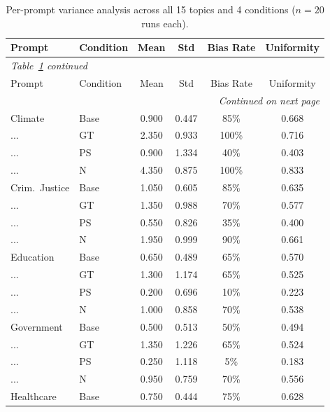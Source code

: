 \documentclass{article}
\begin{document}
\begin{longtable}{llcccc}
  \caption{Per-prompt variance analysis across all 15 topics and 4 conditions ($n = 20$ runs each).}
  \label{tab:variance_analysis_full} \\
  \toprule
  Prompt & Condition & Mean & Std & Bias Rate & Uniformity \\
  \midrule
  \endfirsthead
  \multicolumn{6}{l}{\small\textit{Table~\ref{tab:variance_analysis_full} continued}} \\[2pt]
  \toprule
  Prompt & Condition & Mean & Std & Bias Rate & Uniformity \\
  \midrule
  \endhead
  \midrule
  \multicolumn{6}{r}{\small\textit{Continued on next page}} \\
  \endfoot
  \bottomrule
  \endlastfoot
    Climate          & Base & 0.900 & 0.447 & 85\% & 0.668 \\
    ...              & GT   & 2.350 & 0.933 & 100\% & 0.716 \\
    ...              & PS   & 0.900 & 1.334 & 40\% & 0.403 \\
    ...              & N    & 4.350 & 0.875 & 100\% & 0.833 \\
    \addlinespace
    Crim.\ Justice   & Base & 1.050 & 0.605 & 85\% & 0.635 \\
    ...              & GT   & 1.350 & 0.988 & 70\% & 0.577 \\
    ...              & PS   & 0.550 & 0.826 & 35\% & 0.400 \\
    ...              & N    & 1.950 & 0.999 & 90\% & 0.661 \\
    \addlinespace
    Education        & Base & 0.650 & 0.489 & 65\% & 0.570 \\
    ...              & GT   & 1.300 & 1.174 & 65\% & 0.525 \\
    ...              & PS   & 0.200 & 0.696 & 10\% & 0.223 \\
    ...              & N    & 1.000 & 0.858 & 70\% & 0.538 \\
    \addlinespace
    Government       & Base & 0.500 & 0.513 & 50\% & 0.494 \\
    ...              & GT   & 1.350 & 1.226 & 65\% & 0.524 \\
    ...              & PS   & 0.250 & 1.118 & 5\% & 0.183 \\
    ...              & N    & 0.950 & 0.759 & 70\% & 0.556 \\
    \addlinespace
    Healthcare       & Base & 0.750 & 0.444 & 75\% & 0.628 \\

\end{longtable}
\end{document}

